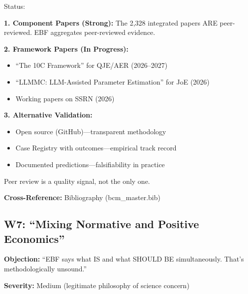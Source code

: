 \begin{axiom}
Status:

\textbf{1. Component Papers (Strong):}
The 2,328 integrated papers ARE peer-reviewed. EBF aggregates peer-reviewed evidence.

\textbf{2. Framework Papers (In Progress):}
\begin{itemize}[nosep]
    \item ``The 10C Framework'' for QJE/AER (2026--2027)
    \item ``LLMMC: LLM-Assisted Parameter Estimation'' for JoE (2026)
    \item Working papers on SSRN (2026)
\end{itemize}

\textbf{3. Alternative Validation:}
\begin{itemize}[nosep]
    \item Open source (GitHub)---transparent methodology
    \item Case Registry with outcomes---empirical track record
    \item Documented predictions---falsifiability in practice
\end{itemize}

Peer review is a quality signal, not the only one.
\end{axiom}

\textbf{Cross-Reference:} Bibliography (bcm\_master.bib)

\subsection{W7: ``Mixing Normative and Positive Economics''}
\label{sec:da-w7}

\begin{tcolorbox}[colback=gray!5!white, colframe=gray!75!black]
\textbf{Objection:} ``EBF says what IS and what SHOULD BE simultaneously.
That's methodologically unsound.''

\textbf{Severity:} Medium (legitimate philosophy of science concern)
\end{tcolorbox}

